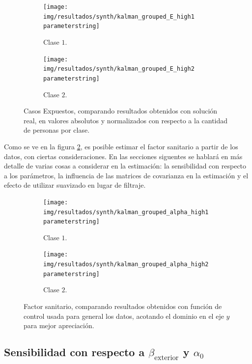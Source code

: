 \begin{figure}[!h]
     \centering
     \begin{subfigure}[b]{\textwidth}
         \centering
         \texttt{[image: img/resultados/synth/kalman\_grouped\_E\_high1\\parameterstring]}
         \caption{Clase \(1\).}
     \end{subfigure}
     \hfill
     \begin{subfigure}[b]{\textwidth}
         \centering
         \texttt{[image: img/resultados/synth/kalman\_grouped\_E\_high2\\parameterstring]}
         \caption{Clase \(2\).}
     \end{subfigure}
        \caption{Casos Expuestos, comparando resultados obtenidos con solución real, en valores absolutos y normalizados con respecto a la cantidad de personas por clase.}
        \label{synth-e-comp-high}
\end{figure}


Como se ve en la figura \ref{synth-alpha-comp-high}, es posible estimar el factor sanitario a partir de los datos, con ciertas consideraciones. En las secciones siguentes  se hablará en más detalle de varias cosas a considerar en la estimación: la sensibilidad con respecto a los parámetros, la influencia de las matrices de covarianza en la estimación y el efecto de utilizar suavizado en lugar de filtraje.

\begin{figure}[!h]
     \centering
     \begin{subfigure}[b]{\textwidth}
         \centering
         \texttt{[image: img/resultados/synth/kalman\_grouped\_alpha\_high1\\parameterstring]}
         \caption{Clase \(1\).}
     \end{subfigure}
     \hfill
     \begin{subfigure}[b]{\textwidth}
         \centering
         \texttt{[image: img/resultados/synth/kalman\_grouped\_alpha\_high2\\parameterstring]}
         \caption{Clase \(2\).}
     \end{subfigure}
        \caption[Factor sanitario, caso sintético]{Factor sanitario, comparando resultados obtenidos con función de control usada para general los datos, acotando el dominio en el eje \(y\) para mejor apreciación.}
        \label{synth-alpha-comp-high}
\end{figure}


\subsection{Sensibilidad con respecto a \(\beta_{\text{exterior}}\) y \(\alpha_0\)} \label{subsec:sensibeta}


